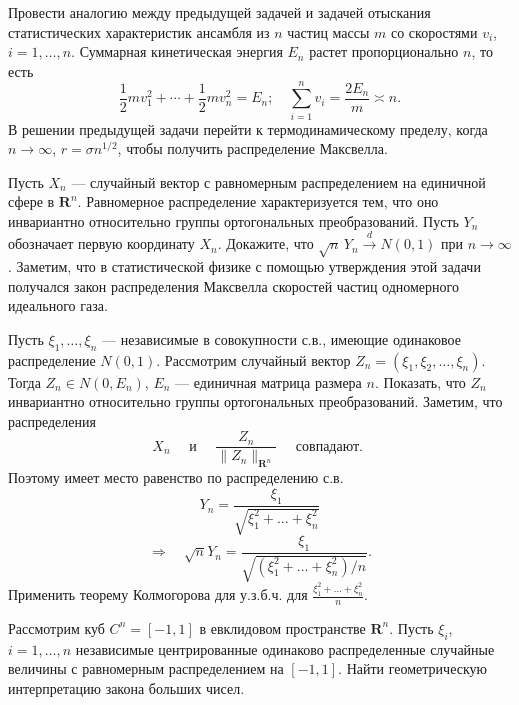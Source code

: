 \begin{problem}
Провести аналогию между предыдущей задачей и задачей отыскания статистических характеристик ансамбля из $n$ частиц массы $m$  со скоростями $v_i$, $i=1,\dots,n$. Суммарная кинетическая энергия $E_n$ растет пропорционально $n$, то есть 
\begin{equation*}
\frac{1}{2}mv_1^2+\cdots+\frac{1}{2}m v_n^2 = E_n;\quad \sum_{i=1}^n v_i=\frac{2E_n}{m}\asymp n.
\end{equation*}
В решении предыдущей задачи перейти к термодинамическому пределу, когда $n\to\infty$, $r = \sigma n^{1/2}$, чтобы получить распределение Максвелла. 
\end{problem}

\begin{problem}
Пусть $X_n$ --- случайный вектор с равномерным распределением на единичной сфере в ${\mathbf R}^n$. Равномерное распределение 
характеризуется тем, что оно инвариантно относительно группы ортогональных преобразований. Пусть $Y_n$ обозначает первую координату $X_n$. 
Докажите, что $\sqrt{n}\, Y_n \xrightarrow{d}N(0,1)$ при $n\to\infty$. Заметим, что в статистической физике с помощью утверждения 
этой задачи получался закон распределения Максвелла скоростей частиц одномерного идеального газа. 
\end{problem}

\begin{remark}
Пусть $\xi_1,\ldots, \xi_n$ --- независимые в совокупности с.в., имеющие одинаковое распределение $N(0,1)$. Рассмотрим случайный вектор 
$Z_n=(\xi_1,\xi_2,\ldots,\xi_n)$. Тогда $Z_n\in N(0,E_n)$, $E_n$ --- единичная матрица размера $n$. Показать, что $Z_n$ инвариантно относительно группы ортогональных преобразований. Заметим, что распределения 
$$
X_n \quad\text{ и } \quad \frac{Z_n}{\|Z_n \|_{{\mathbf R}^n}} \quad \text{ совпадают. }
$$
Поэтому имеет место равенство по распределению с.в. 
$$
Y_n=\frac{\xi_1}{\sqrt{\xi_1^2+\ldots+ \xi_n^2}} 
$$
$$
\Rightarrow \quad \sqrt{n}Y_n = \frac{\xi_1}{\sqrt{(\xi_1^2+\ldots+ \xi_n^2)/n}} . 
$$
Применить теорему Колмогорова для у.з.б.ч. для $\frac{\xi_1^2+\ldots+ \xi_n^2}{n}$. 

\end{remark}

\begin{problem}
Рассмотрим куб $C^n = [-1,1]$ в евклидовом пространстве $\mathbf{R}^n$. Пусть $\xi_i$, $i=1,\dots,n$ независимые центрированные одинаково распределенные случайные величины с равномерным распределением на $[-1,1]$. Найти геометрическую интерпретацию закона больших чисел.
\end{problem}

